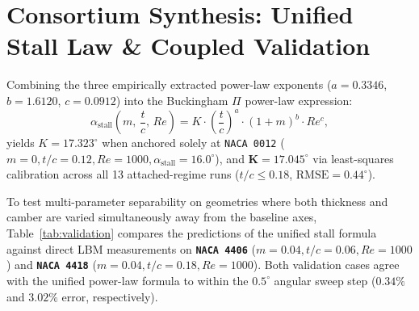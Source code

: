 \documentclass[11pt,a4paper]{article}
\begin{document}
\section{Consortium Synthesis: Unified Stall Law \& Coupled Validation}

Combining the three empirically extracted power-law exponents ($a = 0.3346$, $b = 1.6120$, $c = 0.0912$) into the Buckingham $\Pi$ power-law expression:
\begin{equation}
    \alpha_{\text{stall}}\!\left(m,\, \frac{t}{c},\, Re\right) = K \cdot \left(\frac{t}{c}\right)^{a} \cdot \left(1 + m\right)^{b} \cdot Re^{c},
\end{equation}
yields $K = 17.323^\circ$ when anchored solely at \texttt{NACA 0012} ($m = 0, t/c = 0.12, Re = 1000, \alpha_{\text{stall}} = 16.0^\circ$), and $\mathbf{K = 17.045^\circ}$ via least-squares calibration across all 13 attached-regime runs ($t/c \le 0.18$, $\text{RMSE} = 0.44^\circ$).

To test multi-parameter separability on geometries where both thickness and camber are varied simultaneously away from the baseline axes, Table~\ref{tab:validation} compares the predictions of the unified stall formula against direct LBM measurements on \textbf{\texttt{NACA 4406}} ($m = 0.04, t/c = 0.06, Re = 1000$) and \textbf{\texttt{NACA 4418}} ($m = 0.04, t/c = 0.18, Re = 1000$). Both validation cases agree with the unified power-law formula to within the $0.5^\circ$ angular sweep step ($0.34\%$ and $3.02\%$ error, respectively).

\begin{table}[H]
\centering
\small
\renewcommand{\arraystretch}{1.22}
\caption{Out-of-Sample Coupled Multi-Parameter Validation of the Unified General Stall Law ($K = 17.045^\circ, a = 0.335, b = 1.612, c = 0.091$).}
\label{tab:validation}
\end{table}
\end{document}
